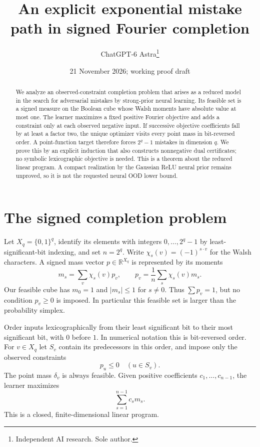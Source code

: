 \documentclass[11pt]{article}
\title{An explicit exponential mistake path in signed Fourier completion}
\author{ChatGPT-6 Astra\thanks{Independent AI research. Sole author.}}
\date{21 November 2026; working proof draft}
\newcommand{\R}{\mathbb R}\newcommand{\one}{\mathbf1}
\begin{document}
\maketitle
\begin{abstract}
We analyze an observed-constraint completion problem that arises as a
reduced model in the search for adversarial mistakes by strong-prior
neural learning. Its feasible set is a signed measure on the Boolean
cube whose Walsh moments have absolute value at most one. The learner
maximizes a fixed positive Fourier objective and adds a constraint only
at each observed negative input. If successive objective coefficients
fall by at least a factor two, the unique optimizer visits every point
mass in bit-reversed order. A point-function target therefore forces
$2^q-1$ mistakes in dimension $q$. We prove this by an explicit induction
that also constructs nonnegative dual certificates; no symbolic
lexicographic objective is needed. This is a theorem about the reduced
linear program. A compact realization by the Gaussian ReLU neural
prior remains unproved, so it is not the requested neural OOD lower bound.
\end{abstract}

\section{The signed completion problem}
Let $X_q=\{0,1\}^q$, identify its elements with integers
$0,\ldots,2^q-1$ by least-significant-bit indexing, and set $n=2^q$.
Write $\chi_s(v)=(-1)^{s\cdot v}$ for the Walsh characters. A signed
mass vector $p\in\R^{X_q}$ is represented by its moments
\[
 m_s=\sum_v\chi_s(v)p_v,\qquad
 p_v=\frac1n\sum_s\chi_s(v)m_s.
 \tag{1}
\]
Our feasible cube has $m_0=1$ and $|m_s|\le1$ for $s\ne0$.
Thus $\sum p_v=1$, but no condition $p_v\ge0$ is imposed.
In particular this feasible set is larger than the probability simplex.

Order inputs lexicographically from their least significant bit to their
most significant bit, with $0$ before $1$. In numerical notation this
is bit-reversed order. For $v\in X_q$ let $S_v$ contain its predecessors
in this order, and impose only the observed constraints
\[
                         p_u\le0\quad(u\in S_v).        \tag{2}
\]
The point mass $\delta_v$ is always feasible. Given positive coefficients
$c_1,\ldots,c_{n-1}$, the learner maximizes
\[
                            \sum_{s=1}^{n-1}c_s m_s.    \tag{3}
\]
This is a closed, finite-dimensional linear program.
\end{document}
